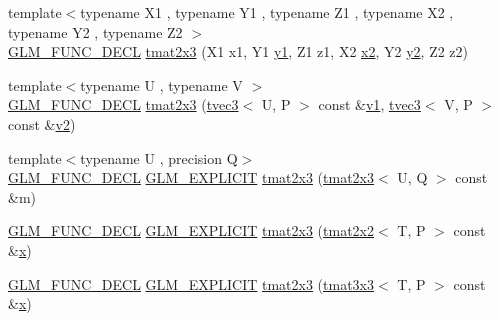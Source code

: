 \begin{DoxyCompactItemize}
\item 
{\footnotesize template$<$typename X1 , typename Y1 , typename Z1 , typename X2 , typename Y2 , typename Z2 $>$ }\\\mbox{\hyperlink{setup_8hpp_ab2d052de21a70539923e9bcbf6e83a51}{G\+L\+M\+\_\+\+F\+U\+N\+C\+\_\+\+D\+E\+CL}} \mbox{\hyperlink{structglm_1_1tmat2x3_ac677b215b77c91b891d953c3a22e599e}{tmat2x3}} (X1 x1, Y1 \mbox{\hyperlink{glad_8h_a48340161068d267815ac3131e9d03def}{y1}}, Z1 z1, X2 \mbox{\hyperlink{glad_8h_ad2cea6eadb01f017f0d57e7edf0ce988}{x2}}, Y2 \mbox{\hyperlink{glad_8h_af7158b5d27f7a6aa4ab9973fcc3a5c20}{y2}}, Z2 z2)
\item 
{\footnotesize template$<$typename U , typename V $>$ }\\\mbox{\hyperlink{setup_8hpp_ab2d052de21a70539923e9bcbf6e83a51}{G\+L\+M\+\_\+\+F\+U\+N\+C\+\_\+\+D\+E\+CL}} \mbox{\hyperlink{structglm_1_1tmat2x3_a7155a096b04a8577bbfc344a163b07c5}{tmat2x3}} (\mbox{\hyperlink{structglm_1_1tvec3}{tvec3}}$<$ U, P $>$ const \&\mbox{\hyperlink{glad_8h_a0779c3b73f9aa3a0ac5b0139b5d291d9}{v1}}, \mbox{\hyperlink{structglm_1_1tvec3}{tvec3}}$<$ V, P $>$ const \&\mbox{\hyperlink{glad_8h_a9a09a1837922b2b806f4589096a52049}{v2}})
\item 
{\footnotesize template$<$typename U , precision Q$>$ }\\\mbox{\hyperlink{setup_8hpp_ab2d052de21a70539923e9bcbf6e83a51}{G\+L\+M\+\_\+\+F\+U\+N\+C\+\_\+\+D\+E\+CL}} \mbox{\hyperlink{setup_8hpp_a6c74f5a5e7b134ab69023ff9a30d4d5d}{G\+L\+M\+\_\+\+E\+X\+P\+L\+I\+C\+IT}} \mbox{\hyperlink{structglm_1_1tmat2x3_a5cd6c10b4d3a99be39f63ccbcc57b210}{tmat2x3}} (\mbox{\hyperlink{structglm_1_1tmat2x3}{tmat2x3}}$<$ U, Q $>$ const \&m)
\item 
\mbox{\hyperlink{setup_8hpp_ab2d052de21a70539923e9bcbf6e83a51}{G\+L\+M\+\_\+\+F\+U\+N\+C\+\_\+\+D\+E\+CL}} \mbox{\hyperlink{setup_8hpp_a6c74f5a5e7b134ab69023ff9a30d4d5d}{G\+L\+M\+\_\+\+E\+X\+P\+L\+I\+C\+IT}} \mbox{\hyperlink{structglm_1_1tmat2x3_a3bc2693e1ce02cbd48703e2c7c6f75d6}{tmat2x3}} (\mbox{\hyperlink{structglm_1_1tmat2x2}{tmat2x2}}$<$ T, P $>$ const \&\mbox{\hyperlink{glad_8h_a92d0386e5c19fb81ea88c9f99644ab1d}{x}})
\item 
\mbox{\hyperlink{setup_8hpp_ab2d052de21a70539923e9bcbf6e83a51}{G\+L\+M\+\_\+\+F\+U\+N\+C\+\_\+\+D\+E\+CL}} \mbox{\hyperlink{setup_8hpp_a6c74f5a5e7b134ab69023ff9a30d4d5d}{G\+L\+M\+\_\+\+E\+X\+P\+L\+I\+C\+IT}} \mbox{\hyperlink{structglm_1_1tmat2x3_a8c8c9b6b9ab00983351a4ffa5f1c1c80}{tmat2x3}} (\mbox{\hyperlink{structglm_1_1tmat3x3}{tmat3x3}}$<$ T, P $>$ const \&\mbox{\hyperlink{glad_8h_a92d0386e5c19fb81ea88c9f99644ab1d}{x}})

\end{DoxyCompactItemize}
